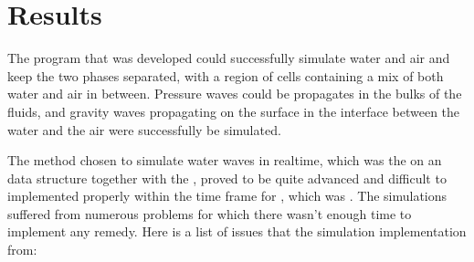 \chapter{Results}


The program that was developed could successfully simulate water and air and keep the two phases separated, with a region of cells containing a mix of both water and air in between. Pressure waves could be propagates in the bulks of the fluids, and gravity waves propagating on the surface in the interface between the water and the air were successfully be simulated.


The method chosen to simulate water waves in realtime, which was the \FVM on an \octree data structure together with the \VOF, proved to be quite advanced and difficult to implemented properly within the time frame for \thismasterthesiswork, which was \masterthesisworktime. The simulations suffered from numerous problems for which there wasn't enough time to implement any remedy. Here is a list of issues that the simulation implementation from:



